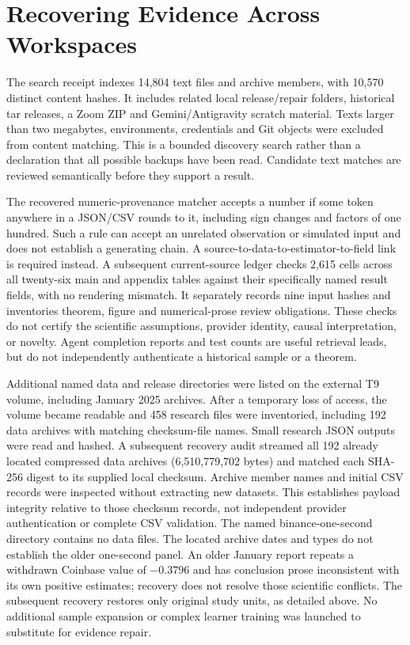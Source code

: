\section{Recovering Evidence Across Workspaces}
The search receipt indexes 14,804 text files and archive members, with 10,570 distinct content hashes. It includes related local release/repair folders, historical tar releases, a Zoom ZIP and Gemini/Antigravity scratch material. Texts larger than two megabytes, environments, credentials and Git objects were excluded from content matching. This is a bounded discovery search rather than a declaration that all possible backups have been read. Candidate text matches are reviewed semantically before they support a result.

The recovered numeric-provenance matcher accepts a number if some token anywhere in a JSON/CSV rounds to it, including sign changes and factors of one hundred. Such a rule can accept an unrelated observation or simulated input and does not establish a generating chain. A source-to-data-to-estimator-to-field link is required instead. A subsequent current-source ledger checks 2,615 cells across all twenty-six main and appendix tables against their specifically named result fields, with no rendering mismatch. It separately records nine input hashes and inventories theorem, figure and numerical-prose review obligations. These checks do not certify the scientific assumptions, provider identity, causal interpretation, or novelty. Agent completion reports and test counts are useful retrieval leads, but do not independently authenticate a historical sample or a theorem.

Additional named data and release directories were listed on the external T9 volume, including January 2025 archives. After a temporary loss of access, the volume became readable and 458 research files were inventoried, including 192 data archives with matching checksum-file names. Small research JSON outputs were read and hashed. A subsequent recovery audit streamed all 192 already located compressed data archives (6,510,779,702 bytes) and matched each SHA-256 digest to its supplied local checksum. Archive member names and initial CSV records were inspected without extracting new datasets. This establishes payload integrity relative to those checksum records, not independent provider authentication or complete CSV validation. The named binance-one-second directory contains no data files. The located archive dates and types do not establish the older one-second panel. An older January report repeats a withdrawn Coinbase value of $-0.3796$ and has conclusion prose inconsistent with its own positive estimates; recovery does not resolve those scientific conflicts. The subsequent recovery restores only original study units, as detailed above. No additional sample expansion or complex learner training was launched to substitute for evidence repair.

